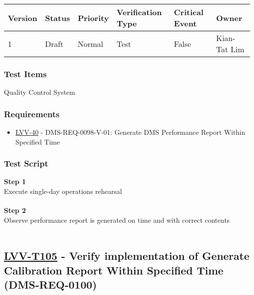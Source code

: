 \begin{longtable}[]{@{}llllll@{}}
\toprule
Version & Status & Priority & Verification Type & Critical Event &
Owner\tabularnewline
\midrule
\endhead
1 & Draft & Normal & Test & False & Kian-Tat Lim\tabularnewline
\bottomrule
\end{longtable}

\hypertarget{test-items-80}{%
\subsubsection{Test Items}\label{test-items-80}}

Quality Control System

\hypertarget{requirements-81}{%
\subsubsection{Requirements}\label{requirements-81}}

\begin{itemize}
\tightlist
\item
  \href{https://jira.lsstcorp.org/browse/LVV-40}{LVV-40} -
  DMS-REQ-0098-V-01: Generate DMS Performance Report Within Specified
  Time
\end{itemize}

\hypertarget{test-script-81}{%
\subsubsection{Test Script}\label{test-script-81}}

\textbf{Step 1}\\
Execute single-day operations rehearsal\\
~\\
\textbf{Step 2}\\
Observe performance report is generated on time and with correct
contents\\
~\\

\hypertarget{lvv-t105---verify-implementation-of-generate-calibration-report-within-specified-time-dms-req-0100}{%
\subsection{\texorpdfstring{\href{https://jira.lsstcorp.org/secure/Tests.jspa\#/testCase/LVV-T105}{LVV-T105}
- Verify implementation of Generate Calibration Report Within Specified
Time
(DMS-REQ-0100)}{LVV-T105 - Verify implementation of Generate Calibration Report Within Specified Time (DMS-REQ-0100)}}\label{lvv-t105---verify-implementation-of-generate-calibration-report-within-specified-time-dms-req-0100}}

